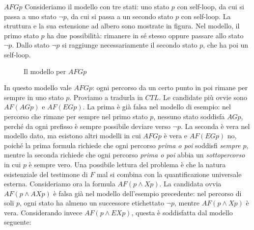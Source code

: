 \begin{example}{\(A FGp\)}
  Consideriamo il modello con tre stati: uno stato \(p\) con self-loop, da cui si passa a uno stato \(\neg p\), da cui si passa a un secondo stato \(p\) con self-loop.
  La struttura e la sua estensione ad albero sono mostrate in figura. Nel modello, il primo stato \(p\) ha due possibilità: rimanere in sé stesso oppure passare allo stato \(\neg p\). Dallo stato \(\neg p\) si raggiunge necessariamente il secondo stato \(p\), che ha poi un self-loop.

  \begin{figure}[H]
    \centering
    \caption{Il modello per \(A FGp\)}\label{fig:ctl-afgp-model}
  \end{figure}

  In questo modello vale \(A FGp\): ogni percorso da un certo punto in poi rimane per sempre in uno stato \(p\). Proviamo a tradurla in \(CTL\)\@. Le candidate più ovvie sono \(AF(AGp)\) e \(AF(EGp)\). La prima è già falsa nel modello di esempio: nel percorso che rimane per sempre nel primo stato \(p\), nessuno stato soddisfa \(AGp\), perché da ogni prefisso è sempre possibile deviare verso \(\neg p\). La seconda è vera nel modello dato, ma esistono altri modelli in cui \(AFGp\) è vera e \(AF(EGp)\) no, poiché la prima formula richiede che ogni percorso \textit{prima o poi} soddisfi \textit{sempre} \(p\), mentre la seconda richiede che ogni percorso \textit{prima o poi} abbia un \textit{sottopercorso} in cui \(p\) è sempre vero. Una possibile lettura del problema è che la natura esistenziale del testimone di \(F\) mal si combina con la quantificazione universale esterna.
\newline
  Consideriamo ora la formula \(AF(p \land Xp)\).
  La candidata ovvia \(AF(p \land AXp)\) è falsa già nel modello dell'esempio precedente: nel percorso di soli \(p\), ogni stato ha almeno un successore etichettato \(\neg p\), mentre \(AF(p \land Xp)\) è vera. Considerando invece \(AF (p\land EXp)\), questa è soddisfatta dal modello seguente:


\end{example}
